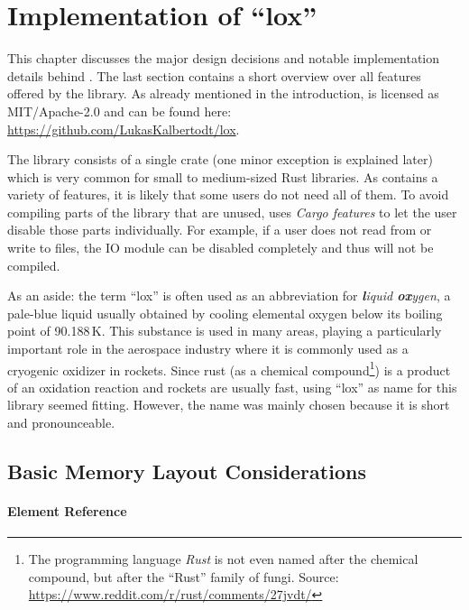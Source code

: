 \chapter{Implementation of \enquote{lox}}

This chapter discusses the major design decisions and notable implementation details behind .
The last section contains a short overview over all features offered by the library. As already mentioned in the introduction,  is licensed as MIT/Apache-2.0 and can be found here: \url{https://github.com/LukasKalbertodt/lox}.

The library consists of a single crate (one minor exception is explained later) which is very common for small to medium-sized Rust libraries.
As  contains a variety of features, it is likely that some users do not need all of them.
To avoid compiling parts of the library that are unused,  uses \emph{Cargo features} to let the user disable those parts individually.
For example, if a user does not read from or write to files, the IO module can be disabled completely and thus will not be compiled.

As an aside:
the term \enquote{lox} is often used as an abbreviation for \emph{\textbf{l}iquid \textbf{ox}ygen}, a pale-blue liquid usually obtained by cooling elemental oxygen below its boiling point of 90.188\,K.
This substance is used in many areas, playing a particularly important role in the aerospace industry where it is commonly used as a cryogenic oxidizer in rockets.
Since rust (as a chemical compound\footnote{The programming language \emph{Rust} is not even named after the chemical compound, but after the \enquote{Rust} family of fungi. Source: \url{https://www.reddit.com/r/rust/comments/27jvdt/}}) is a product of an oxidation reaction and rockets are usually fast, using \enquote{lox} as name for this library seemed fitting.
However, the name was mainly chosen because it is short and pronounceable.


\vspace{1cm}

\section{Basic Memory Layout Considerations}

\subsubsection*{Element Reference}

